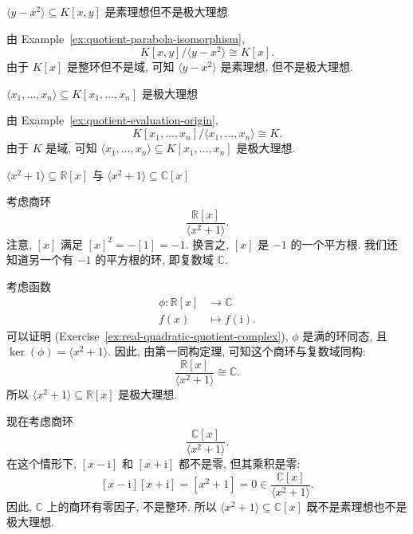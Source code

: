\begin{Example}{{\textmd{$\langle y-x^{2}\rangle\subseteq K[x,y]$} 是素理想但不是极大理想}}
  \leavevmode\label{ex:parabola-ideal-prime-not-maximal}\strut\par\nopagebreak[4]\noindent
  由 Example~\ref{ex:quotient-parabola-isomorphism},
  \[
    K[x,y]/\langle y-x^{2}\rangle\cong K[x].
  \]
  由于 $K[x]$ 是整环但不是域, 可知 $\langle y-x^{2}\rangle$ 是素理想, 但不是极大理想.
\end{Example}

\begin{Example}{{\textmd{$\langle x_{1},\ldots,x_{n}\rangle\subseteq K[x_{1},\ldots,x_{n}]$} 是极大理想}}
  \leavevmode\label{ex:variables-ideal-maximal}\strut\par\nopagebreak[4]\noindent
  由 Example~\ref{ex:quotient-evaluation-origin},
  \[
    K[x_{1},\ldots,x_{n}]/\langle x_{1},\ldots,x_{n}\rangle\cong K.
  \]
  由于 $K$ 是域, 可知 $\langle x_{1},\ldots,x_{n}\rangle\subseteq K[x_{1},\ldots,x_{n}]$ 是极大理想.
\end{Example}

\begin{Example}{{\textmd{$\langle x^{2}+1\rangle\subseteq\mathbb{R}[x]$} 与 \textmd{$\langle x^{2}+1\rangle\subseteq\mathbb{C}[x]$}}}
  \leavevmode\label{ex:quadratic-ideal-real-vs-complex}\strut\par\nopagebreak[4]\noindent
  考虑商环
  \[
    \frac{\mathbb{R}[x]}{\langle x^{2}+1\rangle}.
  \]
  注意, $[x]$ 满足 $[x]^{2}=-[1]=-1$. 换言之, $[x]$ 是 $-1$ 的一个平方根. 我们还知道另一个有 $-1$ 的平方根的环, 即复数域 $\mathbb{C}$.

  考虑函数
  \[
    \begin{aligned}
      \phi:\mathbb{R}[x]&\to\mathbb{C}\\
      f(x)&\mapsto f(\mathrm{i}).
    \end{aligned}
  \]
  可以证明 (Exercise~\ref{ex:real-quadratic-quotient-complex}), $\phi$ 是满的环同态, 且 $\ker(\phi)=\langle x^{2}+1\rangle$. 因此, 由第一同构定理, 可知这个商环与复数域同构:
  \[
    \frac{\mathbb{R}[x]}{\langle x^{2}+1\rangle}\cong\mathbb{C}.
  \]
  所以 $\langle x^{2}+1\rangle\subseteq\mathbb{R}[x]$ 是极大理想.

  现在考虑商环
  \[
    \frac{\mathbb{C}[x]}{\langle x^{2}+1\rangle}.
  \]
  在这个情形下, $[x-\mathrm{i}]$ 和 $[x+\mathrm{i}]$ 都不是零, 但其乘积是零:
  \[
    [x-\mathrm{i}][x+\mathrm{i}]=[x^{2}+1]=0\in\frac{\mathbb{C}[x]}{\langle x^{2}+1\rangle}.
  \]
  因此, $\mathbb{C}$ 上的商环有零因子, 不是整环. 所以 $\langle x^{2}+1\rangle\subseteq\mathbb{C}[x]$ 既不是素理想也不是极大理想.
\end{Example}

